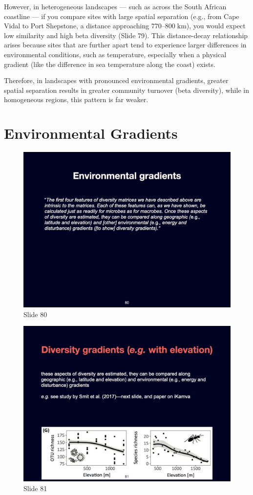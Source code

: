 \documentclass[
  10pt,
]{book}
\begin{document}
However, in heterogeneous landscapes --- such as across the South
African coastline --- if you compare sites with large spatial separation
(e.g., from Cape Vidal to Port Shepstone, a distance approaching
\(770\)--\(800\;\mathrm{km}\)), you would expect low similarity and high
beta diversity (Slide 79). This distance-decay relationship arises
because sites that are further apart tend to experience larger
differences in environmental conditions, such as temperature, especially
when a physical gradient (like the difference in sea temperature along
the coast) exists.

Therefore, in landscapes with pronounced environmental gradients,
greater spatial separation results in greater community turnover (beta
diversity), while in homogeneous regions, this pattern is far weaker.

\section{Environmental Gradients}\label{environmental-gradients-2}

\begin{figure}[ht]
\centering
\includegraphics[width=0.8\linewidth]{../images/BDC334/BDC334-080.jpeg}
\caption*{Slide 80}
\end{figure}

\begin{figure}[ht]
\centering
\includegraphics[width=0.8\linewidth]{../images/BDC334/BDC334-081.jpeg}
\caption*{Slide 81}
\end{figure}
\end{document}
